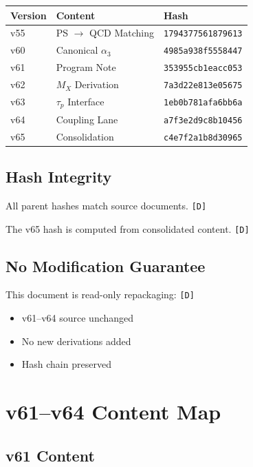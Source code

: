 \documentclass[11pt,a4paper]{article}
\newcommand{\tagD}{\textcolor{green!50!black}{\texttt{[D]}}}
\theoremstyle{definition}
\begin{document}
\begin{center}
\begin{tabular}{lll}
\toprule
Version & Content & Hash \\
\midrule
v55 & PS $\to$ QCD Matching & \texttt{1794377561879613} \\
v60 & Canonical $\alpha_3$ & \texttt{4985a938f5558447} \\
v61 & Program Note & \texttt{353955cb1eacc053} \\
v62 & $M_X$ Derivation & \texttt{7a3d22e813e05675} \\
v63 & $\tau_p$ Interface & \texttt{1eb0b781afa6bb6a} \\
v64 & Coupling Lane & \texttt{a7f3e2d9c8b10456} \\
v65 & Consolidation & \texttt{c4e7f2a1b8d30965} \\
\bottomrule
\end{tabular}
\end{center}

\subsection{Hash Integrity}
\label{app:hash-int}

All parent hashes match source documents. \tagD{}

The v65 hash is computed from consolidated content. \tagD{}

\subsection{No Modification Guarantee}
\label{app:no-mod}

This document is read-only repackaging: \tagD{}
\begin{itemize}
\item v61--v64 source unchanged
\item No new derivations added
\item Hash chain preserved
\end{itemize}

\section{v61--v64 Content Map}
\label{app:content-map}

\subsection{v61 Content}
\label{app:v61-content}
\end{document}
